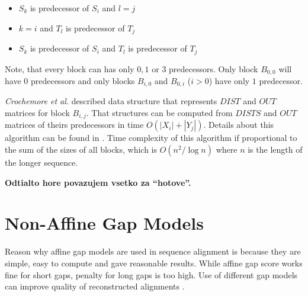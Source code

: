 
\begin{itemize}
\item $S_k$ is predecessor of $S_i$ and $l=j$
\item $k=i$ and $T_l$ is predecessor of $T_j$
\item $S_k$ is predecessor of $S_i$ and $T_l$ is predecessor of $T_j$
\end{itemize}

Note, that every block can has only $0,1$ or $3$ predecessors. Only block
$B_{0,0}$ will have $0$ predecessors and only blocks $B_{i,0}$ and $B_{0,i}$
($i>0$) have only $1$ predecessor.  

{\it Crochemore et al.} described data structure that represents $DIST$ and $OUT$
matrices for block \nocite{Crochemore2002} $B_{i,j}$. That structures can be
computed from $DISTS$ and $OUT$ matrices of theirs predecessors in time
$O(|X_i|+|Y_j|)$. Details about this algorithm can be found in
\cite{Crochemore2002}. Time complexity of this algorithm if proportional to the
sum of the sizes of all blocks, which is $O(n^2/\log n)$ where $n$ is the length
of the longer sequence.

\bigskip
{\large\bf Odtialto hore povazujem vsetko za ``hotove''. }
\bigskip



\section{Non-Affine Gap Models} 

 Reason why affine gap models are
used in sequence alignment is because they are simple, easy to compute and gave
reasonable results. While affine gap score works fine for short gaps, penalty
for long gaps is too high. Use of different gap models can improve quality of
reconstructed alignments \cite{Gill2004,Cartwright2009}.

